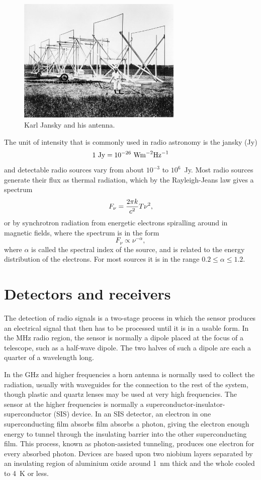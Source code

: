\begin{figure}[h]
  \centering
	\includegraphics[width=0.7\textwidth]{jansky-antenna.eps}
  \caption{Karl Jansky and his antenna.}
  \label{fig:jansky-antenna}
\end{figure}

The unit of intensity that is commonly used in radio astronomy is the 
jansky (Jy)
\[
1~{\rm Jy}=10^{-26}~{\rm W m}^{-2}{\rm Hz}^{-1}
\]
and detectable radio sources vary from about $10^{-3}$ to $10^6$~Jy. Most
radio sources generate their flux as thermal radiation, which by the 
Rayleigh-Jeans law gives a spectrum
\[
F_\nu={2\pi k\over c^2}T\nu^2,
\]
or by synchrotron radiation from energetic electrons spiralling around
in magnetic fields, where the spectrum is in the form
\[
F_\nu\propto\nu^{-\alpha},
\]
where $\alpha$ is called the spectral index of the source, and is related
to the energy distribution of the electrons. For most sources it is in the
range $0.2\le \alpha\le 1.2$.

\section{Detectors and receivers}

The detection of radio signals is a two-stage process in which the sensor
produces an electrical signal that then has to be processed until it is in
a usable form. In the MHz radio region, the sensor is normally a dipole 
placed at the focus of a telescope, such as a half-wave dipole. The two halves
of such a dipole are each a quarter of a wavelength long. 

In the GHz and higher frequencies a horn antenna is normally used to collect 
the radiation, usually with waveguides for the connection to the rest of the 
system, though plastic and quartz lenses may be used at very high frequencies.
The sensor at the higher frequencies is normally a 
superconductor-insulator-superconductor (SIS) device. In an SIS detector, an
electron in one superconducting film absorbs film absorbs a photon, giving the
electron enough energy to tunnel through the insulating barrier into the other
superconducting film. This process, known as photon-assisted tunneling, 
produces one electron for every absorbed photon. Devices are based upon two
niobium layers separated by an insulating region of aluminium oxide around
1~nm thick and the whole cooled to 4~K or less.

